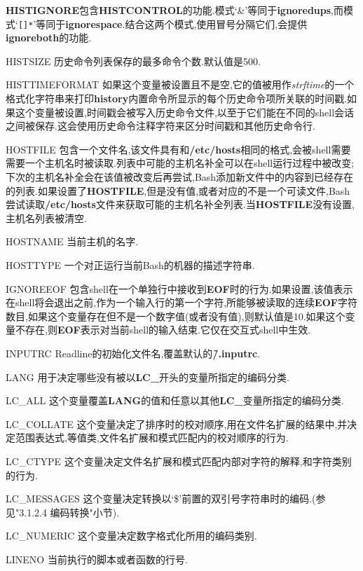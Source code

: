 \documentclass[draft,openany]{book}
\begin{document}
\begin{CJK}{UTF8}{gbsn}
\begin{basedescript}{\desclabelstyle{\nextlinelabel}\desclabelwidth{2.5em}}
        \textbf{HISTIGNORE}包含\textbf{HISTCONTROL}的功能.模式`\&'等同于\textbf{ignoredups},而模式`\verb+[]*+'等同于\textbf{ignorespace}.结合这两个模式,使用冒号分隔它们,会提供\textbf{ignoreboth}的功能.
    \item[HISTSIZE] 历史命令列表保存的最多命令个数.默认值是500.
    \item[HISTTIMEFORMAT] 如果这个变量被设置且不是空,它的值被用作\emph{strftime}的一个格式化字符串来打印\textbf{history}内置命令所显示的每个历史命令项所关联的时间戳.如果这个变量被设置,时间戳会被写入历史命令文件,以至于它们能在不同的shell会话之间被保存.这会使用历史命令注释字符来区分时间戳和其他历史命令行.
    \item[HOSTFILE] 包含一个文件名,该文件具有和\textbf{/etc/hosts}相同的格式,会被shell需要需要一个主机名时被读取.列表中可能的主机名补全可以在shell运行过程中被改变;下次的主机名补全会在该值被改变后再尝试,Bash添加新文件中的内容到已经存在的列表.如果设置了\textbf{HOSTFILE},但是没有值,或者对应的不是一个可读文件,Bash尝试读取\textbf{/etc/hosts}文件来获取可能的主机名补全列表.当\textbf{HOSTFILE}没有设置,主机名列表被清空.
    \item[HOSTNAME] 当前主机的名字.
    \item[HOSTTYPE] 一个对正运行当前Bash的机器的描述字符串.
    \item[IGNOREEOF] 包含shell在一个单独行中接收到\textbf{EOF}时的行为.如果设置,该值表示在shell将会退出之前,作为一个输入行的第一个字符,所能够被读取的连续\textbf{EOF}字符数目,如果这个变量存在但不是一个数字值(或者没有值),则默认值是10.如果这个变量不存在,则\textbf{EOF}表示对当前shell的输入结束.它仅在交互式shell中生效.
    \item[INPUTRC] Readline的初始化文件名,覆盖默认的\textbf{\~/.inputrc}.
    \item[LANG] 用于决定哪些没有被以\textbf{LC\_}开头的变量所指定的编码分类.
    \item[LC\_ALL] 这个变量覆盖\textbf{LANG}的值和任意以其他\textbf{LC\_}变量所指定的编码分类.
    \item[LC\_COLLATE] 这个变量决定了排序时的校对顺序,用在文件名扩展的结果中,并决定范围表达式,等值类,文件名扩展和模式匹配内的校对顺序的行为.
    \item[LC\_CTYPE] 这个变量决定文件名扩展和模式匹配内部对字符的解释,和字符类别的行为.
    \item[LC\_MESSAGES] 这个变量决定转换以`\$'前置的双引号字符串时的编码.(参见"3.1.2.4 编码转换"小节).
    \item[LC\_NUMERIC] 这个变量决定数字格式化所用的编码类别.
    \item[LINENO] 当前执行的脚本或者函数的行号.

\end{basedescript}
\end{CJK}
\end{document}
